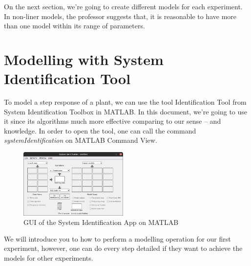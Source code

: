 \documentclass[11pt,a4paper,twocolumn]{article}
\begin{document}
On the next section, we're going to create different models for each experiment. In non-liner models, the professor suggests that, it is reasonable to have more than one model within its range of parameters.


\section{Modelling with System Identification Tool}
\label{sec:modellingthestepresponse}

To model a step response of a plant, we can use the tool Identification Tool from System Identification Toolbox in MATLAB. In this document, we're going to use it since its algorithms much more effective comparing to our sense -- and knowledge. In order to open the tool, one can call the command \textit{systemIdentification} on MATLAB Command View.

\begin{figure}[H]
    \centering
    \includegraphics[width=0.48\textwidth]{Graphs/SystemIdentificationToolApp.png}
    \caption{GUI of the System Identification App on MATLAB}
\end{figure}

We will introduce you to how to perform a modelling operation for our first experiment, however, one can do every step detailed if they want to achieve the models for other experiments.
\end{document}
